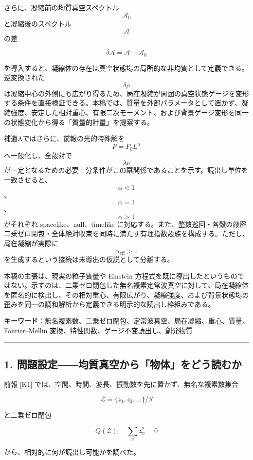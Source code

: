 \documentclass[
  a4paper,
]{ltjsarticle}
\begin{document}
さらに、凝縮前の均質真空スペクトル \[\mathcal A_0\] と凝縮後のスペクトル
\[\mathcal A\] の差

\[
\delta\mathcal A
=
\mathcal A-\mathcal A_0
\]

を導入すると、凝縮体の存在は真空状態場の局所的な非均質として定義できる。逆変換された
\[\delta\rho\]
は凝縮中心の外側にも広がり得るため、局在凝縮が周囲の真空状態ゲージを変形する条件を直接検証できる。本稿では、質量を外部パラメータとして置かず、凝縮強度、安定した相対重心、有限二次モーメント、および背景ゲージ変形を同一の状態変化から得る「質量的計量」を提案する。

補遺Aではさらに、前報の光的特殊解を \[P=P_0L^\alpha\]
へ一般化し、全殻対で \[\lambda\nu\]
が一定となるための必要十分条件がこの冪関係であることを示す。読出し単位を一致させると、\[\alpha<1\]、\[\alpha=1\]、\[\alpha>1\]
がそれぞれ spacelike、null、timelike
に対応する。また、整数巡回・各殻の厳密二乗ゼロ閉包・全体絶対収束を同時に満たす有理指数殻族を構成する。ただし、局在凝縮が実際に
\[\alpha_{\mathrm{eff}}>1\]
を生成するという接続は未導出の仮説として分離する。

本稿の主張は、現実の粒子質量や Einstein
方程式を既に導出したというものではない。示すのは、二乗ゼロ閉包した無名複素定常波真空に対して、局在凝縮体を匿名的に検出し、その相対重心、有限広がり、凝縮強度、および背景状態場の歪みを同一の調和解析から定義できる明示的な読出し枠組みである。

\textbf{キーワード}：無名複素数、二乗ゼロ閉包、定常波真空、局在凝縮、重心、質量、Fourier--Mellin
変換、特性関数、ゲージ不変読出し、創発物質

\begin{center}\rule{0.5\linewidth}{0.5pt}\end{center}

\subsection{1.
問題設定――均質真空から「物体」をどう読むか}\label{ux554fux984cux8a2dux5b9aux5747ux8ceaux771fux7a7aux304bux3089ux7269ux4f53ux3092ux3069ux3046ux8aadux3080ux304b}

前報 {[}K1{]}
では、空間、時間、波長、振動数を先に置かず、無名な複素数集合

\[
\mathcal Z
=
\{z_1,z_2,\ldots\}/S
\]

と二乗ゼロ閉包

\[
Q(\mathcal Z)
=
\sum_n z_n^2
=
0
\tag{1}
\]

から、相対的に何が読出し可能かを調べた。
\end{document}
